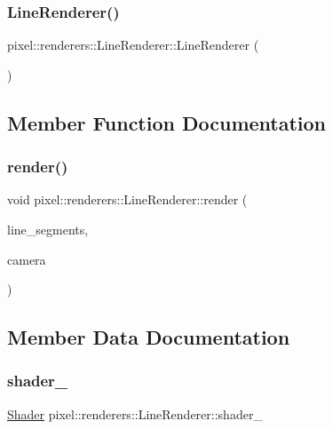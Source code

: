 \subsubsection{\texorpdfstring{Line\+Renderer()}{LineRenderer()}}
{\footnotesize\ttfamily pixel\+::renderers\+::\+Line\+Renderer\+::\+Line\+Renderer (\begin{DoxyParamCaption}{ }\end{DoxyParamCaption})}



\subsection{Member Function Documentation}
\mbox{\label{classpixel_1_1renderers_1_1_line_renderer_a1980b5f5590d1f2c13d83db2551d819d}} 
\subsubsection{\texorpdfstring{render()}{render()}}
{\footnotesize\ttfamily void pixel\+::renderers\+::\+Line\+Renderer\+::render (\begin{DoxyParamCaption}\item[{const vector$<$ \hyperlink{classpixel_1_1_line_segment}{Line\+Segment} $>$ \&}]{line\+\_\+segments,  }\item[{const \hyperlink{classpixel_1_1graphics_1_1_camera}{Camera} \&}]{camera }\end{DoxyParamCaption})}



\subsection{Member Data Documentation}
\mbox{\label{classpixel_1_1renderers_1_1_line_renderer_a6a2758421a2ee6e249d78deb3a8d6ca2}} 
\subsubsection{\texorpdfstring{shader\+\_\+}{shader\_}}
{\footnotesize\ttfamily \hyperlink{classpixel_1_1graphics_1_1_shader}{Shader} pixel\+::renderers\+::\+Line\+Renderer\+::shader\+\_\+\hspace{0.3cm}{\ttfamily [private]}}

